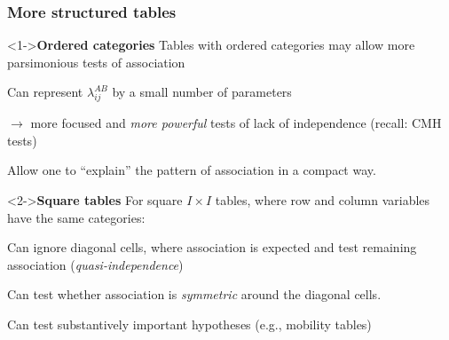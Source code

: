 \renewcommand{\FileName}{structured}
\begin{frame}
  \frametitle{More structured tables}
  \begin{block}<1->{\large\bfseries Ordered categories}
      Tables with ordered categories may allow more \alert{parsimonious} tests of association
      \begin{itemize*}
	  \item Can represent $\lambda_{ij}^{AB}$ by a small number of parameters
	  \item $\rightarrow$ more focused and \emph{more powerful} tests of lack of independence (recall: CMH tests)
          \item Allow one to ``explain'' the \alert{pattern} of association in a compact way.
	  \end{itemize*}
  \end{block}

   \begin{block}<2->{\large\bfseries Square tables}
	For square $I \times I$ tables, where row and column variables have the
		same categories:
      \begin{itemize*}
	  	\item Can ignore diagonal cells, where association is expected and test
		remaining association (\emph{quasi-independence})
		\item Can  test whether association is \emph{symmetric} around the diagonal cells.
		\item Can test \alert{substantively important} hypotheses (e.g., mobility tables)
      \end{itemize*}
  \end{block}
\end{frame}

